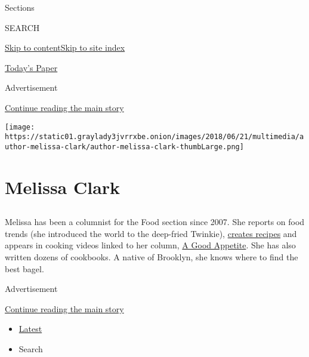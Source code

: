 Sections

SEARCH

\protect\hyperlink{site-content}{Skip to
content}\protect\hyperlink{site-index}{Skip to site index}

\href{https://myaccount.nytimes3xbfgragh.onion/auth/login?response_type=cookie\&client_id=vi}{}

\href{https://www.nytimes3xbfgragh.onion/section/todayspaper}{Today's
Paper}

Advertisement

\protect\hyperlink{after-top}{Continue reading the main story}

\texttt{[image: https://static01.graylady3jvrrxbe.onion/images/2018/06/21/multimedia/author-melissa-clark/author-melissa-clark-thumbLarge.png]}

\hypertarget{melissa-clark}{%
\section{Melissa Clark}\label{melissa-clark}}

\subsection{}

Melissa has been a columnist for the Food section since 2007. She
reports on food trends (she introduced the world to the deep-fried
Twinkie),
\href{https://cooking.nytimes3xbfgragh.onion/ourcooks/melissa-clark/my-recipes}{creates
recipes} and appears in cooking videos linked to her column,
\href{https://www.nytimes3xbfgragh.onion/column/a-good-appetite}{A Good
Appetite}. She has also written dozens of cookbooks. A native of
Brooklyn, she knows where to find the best bagel.

Advertisement

\protect\hyperlink{after-mid1}{Continue reading the main story}

\begin{itemize}
\tightlist
\item
  \protect\hyperlink{stream-panel}{Latest}
\item
  Search
\end{itemize}

